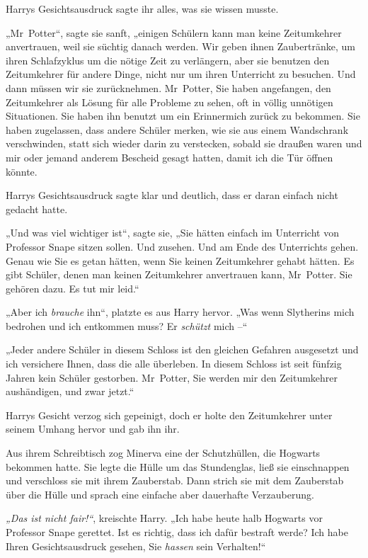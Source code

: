 {Harrys Gesichtsausdruck sagte ihr alles, was sie wissen musste.

„Mr~Potter“, sagte sie sanft, „einigen Schülern kann man keine Zeitumkehrer anvertrauen, weil sie süchtig danach werden. Wir geben ihnen Zaubertränke, um ihren Schlafzyklus um die nötige Zeit zu verlängern, aber sie benutzen den Zeitumkehrer für andere Dinge, nicht nur um ihren Unterricht zu besuchen. Und dann müssen wir sie zurücknehmen. Mr~Potter, Sie haben angefangen, den Zeitumkehrer als Lösung für alle Probleme zu sehen, oft in völlig unnötigen Situationen. Sie haben ihn benutzt um ein Erinnermich zurück zu bekommen. Sie haben zugelassen, dass andere Schüler merken, wie sie aus einem Wandschrank verschwinden, statt sich wieder darin zu verstecken, sobald sie draußen waren und mir oder jemand anderem Bescheid gesagt hatten, damit ich die Tür öffnen könnte.

Harrys Gesichtsausdruck sagte klar und deutlich, dass er daran einfach nicht gedacht hatte.

„Und was viel wichtiger ist“, sagte sie, „Sie hätten einfach im Unterricht von Professor Snape sitzen sollen. Und zusehen. Und am Ende des Unterrichts gehen. Genau wie Sie es getan hätten, wenn Sie keinen Zeitumkehrer gehabt hätten. Es gibt Schüler, denen man keinen Zeitumkehrer anvertrauen kann, Mr~Potter. Sie gehören dazu. Es tut mir leid.“

„Aber ich \emph{brauche} ihn“, platzte es aus Harry hervor. „Was wenn Slytherins mich bedrohen und ich entkommen muss? Er \emph{schützt} mich --“

„Jeder andere Schüler in diesem Schloss ist den gleichen Gefahren ausgesetzt und ich versichere Ihnen, dass die alle überleben. In diesem Schloss ist seit fünfzig Jahren kein Schüler gestorben. Mr~Potter, Sie werden mir den Zeitumkehrer aushändigen, und zwar jetzt.“

Harrys Gesicht verzog sich gepeinigt, doch er holte den Zeitumkehrer unter seinem Umhang hervor und gab ihn ihr.

Aus ihrem Schreibtisch zog Minerva eine der Schutzhüllen, die Hogwarts bekommen hatte. Sie legte die Hülle um das Stundenglas, ließ sie einschnappen und verschloss sie mit ihrem Zauberstab. Dann strich sie mit dem Zauberstab über die Hülle und sprach eine einfache aber dauerhafte Verzauberung.

\emph{„Das ist nicht fair!“}, kreischte Harry. „Ich habe heute halb Hogwarts vor Professor Snape gerettet. Ist es richtig, dass ich dafür bestraft werde? Ich habe Ihren Gesichtsausdruck gesehen, Sie \emph{hassen} sein Verhalten!“

}

